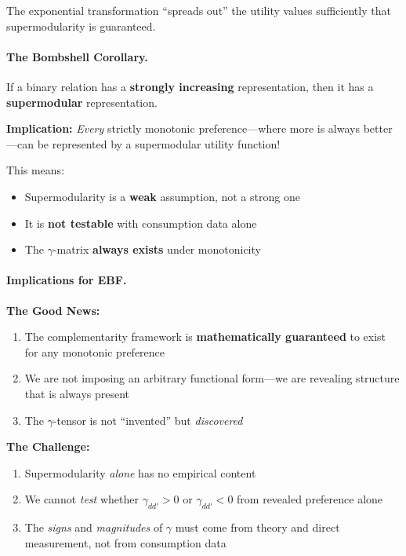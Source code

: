 The exponential transformation ``spreads out'' the utility values sufficiently 
that supermodularity is guaranteed.

\paragraph{The Bombshell Corollary.}

\begin{corollary}
\label{cor:strongly-increasing}
If a binary relation has a \textbf{strongly increasing} representation, 
then it has a \textbf{supermodular} representation.
\end{corollary}

\textbf{Implication:} \emph{Every} strictly monotonic preference---where more 
is always better---can be represented by a supermodular utility function!

This means:
\begin{itemize}
    \item Supermodularity is a \textbf{weak} assumption, not a strong one
    \item It is \textbf{not testable} with consumption data alone
    \item The $\gamma$-matrix \textbf{always exists} under monotonicity
\end{itemize}

\paragraph{Implications for EBF.}

\textbf{The Good News:}
\begin{enumerate}
    \item The complementarity framework is \textbf{mathematically guaranteed} 
    to exist for any monotonic preference
    \item We are not imposing an arbitrary functional form---we are revealing 
    structure that is always present
    \item The $\gamma$-tensor is not ``invented'' but \emph{discovered}
\end{enumerate}

\textbf{The Challenge:}
\begin{enumerate}
    \item Supermodularity \emph{alone} has no empirical content
    \item We cannot \emph{test} whether $\gamma_{dd'} > 0$ or $\gamma_{dd'} < 0$ 
    from revealed preference alone
    \item The \emph{signs} and \emph{magnitudes} of $\gamma$ must come from 
    theory and direct measurement, not from consumption data
\end{enumerate}

